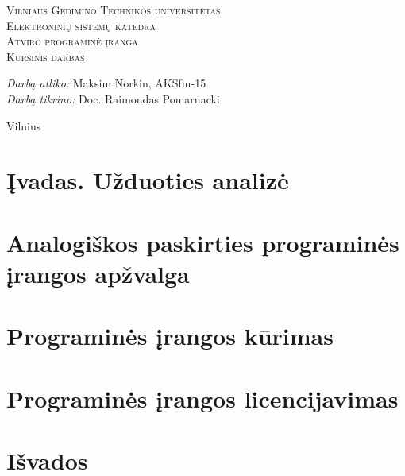 \documentclass[12pt,a4paper]{article}
\begin{document}
\begin{titlepage}
  
  \begin{center}
    \textsc{\LARGE Vilniaus Gedimino Technikos universitetas}\\[2mm]
    \textsc{\Large Elektroninių sistemų katedra}\\[70mm]
    \textsc{\Large Atviro programinė įranga}\\[10mm]
    \textsc{\normalsize Kursinis darbas}\\[40mm]
    \begin{minipage}{1\textwidth}
      \begin{flushright}
        \emph{Darbą atliko:} Maksim Norkin, AKSfm-15\\
        \emph{Darbą tikrino:} Doc. Raimondas Pomarnacki\\
      \end{flushright}
    \end{minipage}
    \vfill
    {\large Vilnius \\ \the\year}
  \end{center}
\end{titlepage}
\tableofcontents
\newpage

\section{Įvadas. Užduoties analizė}



\section{Analogiškos paskirties programinės įrangos apžvalga}



\section{Programinės įrangos kūrimas}



\section{Programinės įrangos licencijavimas}



\section{Išvados}



\newpage

\renewcommand\refname{Literatūros ir informacinių šaltinių sąrašas}




\newpage

\renewcommand\refname{Priedai}
\end{document}
